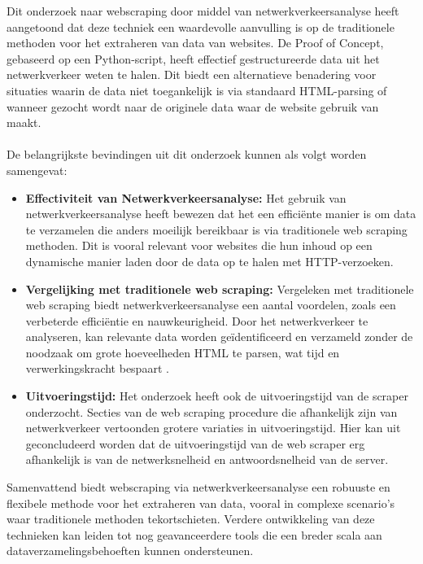 Dit onderzoek naar webscraping door middel van netwerkverkeersanalyse heeft aangetoond dat deze techniek een waardevolle aanvulling is op de traditionele methoden voor het extraheren van data van websites. De Proof of Concept, gebaseerd op een Python-script, heeft effectief gestructureerde data uit het netwerkverkeer weten te halen. Dit biedt een alternatieve benadering voor situaties waarin de data niet toegankelijk is via standaard HTML-parsing of wanneer gezocht wordt naar de originele data waar de website gebruik van maakt.
\\ \\
De belangrijkste bevindingen uit dit onderzoek kunnen als volgt worden samengevat:
\begin{itemize}
    \item \textbf{Effectiviteit van Netwerkverkeersanalyse: }Het gebruik van netwerkverkeersanalyse heeft bewezen dat het een efficiënte manier is om data te verzamelen die anders moeilijk bereikbaar is via traditionele web scraping methoden. Dit is vooral relevant voor websites die hun inhoud op een dynamische manier laden door de data op te halen met HTTP-verzoeken.

    \item \textbf{Vergelijking met traditionele web scraping: }Vergeleken met traditionele web scraping biedt netwerkverkeersanalyse een aantal voordelen, zoals een verbeterde efficiëntie en nauwkeurigheid. Door het netwerkverkeer te analyseren, kan relevante data worden geïdentificeerd en verzameld zonder de noodzaak om grote hoeveelheden HTML te parsen, wat tijd en verwerkingskracht bespaart .

    \item \textbf{Uitvoeringstijd: }Het onderzoek heeft ook de uitvoeringstijd van de scraper onderzocht. Secties van de web scraping procedure die afhankelijk zijn van netwerkverkeer vertoonden grotere variaties in uitvoeringstijd. Hier kan uit geconcludeerd worden dat de uitvoeringstijd van de web scraper erg afhankelijk is van de netwerksnelheid en antwoordsnelheid van de server.
\end{itemize}

Samenvattend biedt webscraping via netwerkverkeersanalyse een robuuste en flexibele methode voor het extraheren van data, vooral in complexe scenario's waar traditionele methoden tekortschieten. Verdere ontwikkeling van deze technieken kan leiden tot nog geavanceerdere tools die een breder scala aan dataverzamelingsbehoeften kunnen ondersteunen.
